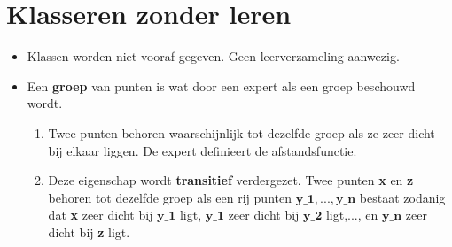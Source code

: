 \section{Klasseren zonder leren}
\begin{itemize}
	\item Klassen worden niet vooraf gegeven.
	\alert Geen leerverzameling aanwezig.
	\item Een \textbf{groep} van punten is wat door een expert als een groep beschouwd wordt.
	\begin{enumerate}
		\item Twee punten behoren waarschijnlijk tot dezelfde groep als ze zeer dicht bij elkaar liggen. De expert definieert de afstandsfunctie.
		\item Deze eigenschap wordt \textbf{transitief} verdergezet. Twee punten \textbf{x} en \textbf{z} behoren tot dezelfde groep als een rij punten $\textbf{y_1},...,\textbf{y_n}$ bestaat zodanig dat \textbf{x} zeer dicht bij $\textbf{y_1}$ ligt, $\textbf{y_1}$ zeer dicht bij $\textbf{y_2}$ ligt,..., en $\textbf{y_n}$ zeer dicht bij \textbf{z} ligt. 
	\end{enumerate}
\end{itemize}
